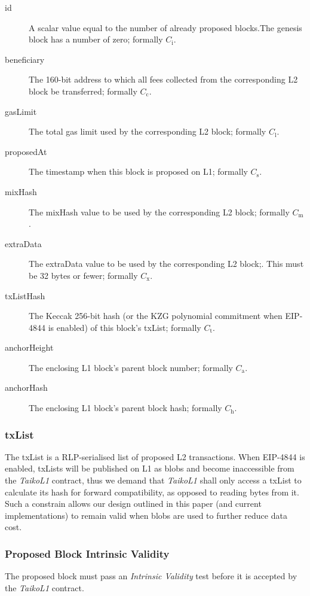 \documentclass[9pt,oneside]{amsart}
\begin{document}
\begin{multicols}{2}
\begin{description}
\item[id] A scalar value equal to the number of already proposed blocks.The genesis block has a number of zero; formally $C_{\mathrm{i}}$.
\item[beneficiary] The 160-bit address to which all fees collected from the corresponding L2 block be transferred; formally $C_{\mathrm{c}}$.
\item[gasLimit] The total gas limit used by the corresponding L2 block; formally $C_{\mathrm{l}}$.
\item[proposedAt] The timestamp when this block is proposed on L1; formally $C_{\mathrm{s}}$.
\item[mixHash] The mixHash value to be used by the corresponding L2 block; formally $C_{\mathrm{m}}$.
\item[extraData] The extraData value to be used by the corresponding L2 block;. This must be 32 bytes or fewer; formally $C_{\mathrm{x}}$.
\item[txListHash] The Keccak 256-bit hash (or the KZG polynomial commitment when EIP-4844 is enabled) of this block's txList; formally $C_{\mathrm{t}}$. 
\item[anchorHeight] The enclosing L1 block's parent block number; formally $C_{\mathrm{a}}$.
\item[anchorHash] The enclosing L1 block's parent block hash; formally $C_{\mathrm{h}}$.
\end{description}

\subsubsection{txList}\label{sec:txlist}
The txList is a RLP-serialised list of proposed L2 transactions. When EIP-4844 is enabled, txLists will be published on L1 as blobs\cite{eip4844} and become inaccessible from the \textit{TaikoL1} contract, thus we demand that \textit{TaikoL1} shall only access a txList to calculate its hash for forward compatibility, as opposed to reading bytes from it. Such a constrain allows our design outlined in this paper (and current implementations) to remain valid when blobs are used to further reduce data cost.




\subsubsection{Proposed Block Intrinsic Validity}
The proposed block must pass an \textit{Intrinsic Validity} test before it is accepted by the \textit{TaikoL1} contract. 


\end{multicols}
\end{document}

